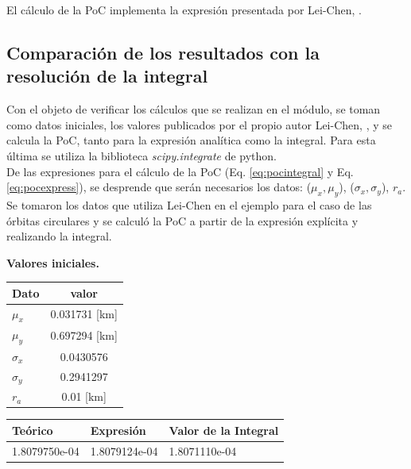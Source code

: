 El c\'alculo de la PoC implementa la expresi\'on presentada por Lei-Chen, \citep{leichen}.


\subsection*{Comparaci\'on de los resultados con la resoluci\'on de la integral}
Con el objeto de verificar los c\'alculos que se realizan en el m\'odulo, se toman como datos iniciales, los valores publicados por el propio autor Lei-Chen, \citep{leichen}, y se calcula la PoC, tanto para la expresi\'on anal\'itica como la integral. Para esta \'ultima se utiliza la biblioteca {\it{scipy.integrate}}  de python.\\

De las expresiones para el c\'alculo de la PoC (Eq. \ref{eq:pocintegral} y Eq. \ref{eq:pocexpress}), se desprende que ser\'an necesarios los datos: ($\mu_{x}, \mu_{y}$), ($\sigma_{x}, \sigma_{y}$), $r_{a}$.\\

Se tomaron los datos que utiliza Lei-Chen en el ejemplo para el caso de las \'orbitas circulares y se calcul\'o la PoC a partir de la expresi\'on expl\'icita y realizando la integral.\\

\begin{minipage}[t]{0.28\textwidth}
{\bf{Valores iniciales.}}\\

\begin{tabular}{|lc|}
\hline
 Dato & valor \\
\hline
$\mu_{x}$ & 0.031731 [km]\\
$\mu_{y}$ & 0.697294 [km]\\
$\sigma_{x}$ & 0.0430576\\
$\sigma_{y}$ & 0.2941297\\
$r_{a}$ & 0.01 [km]\\
\hline
\end{tabular}
\end{minipage}
\begin{minipage}[t]{0.7\textwidth}
\begin{mdframed}[
        linecolor=red,linewidth=2pt,%
        frametitlerule=true,%
        apptotikzsetting={\tikzset{mdfframetitlebackground/.append style={%
            shade,left color=white, right color=blue!20}}}, 
        frametitlerulecolor=blue,
        frametitlerulewidth=1pt, innertopmargin=\topskip,
        frametitle={Probabilidad de Colisi\'on},
        outerlinewidth=1.25pt
    ]
\large
{}
\begin{tabular}{|l|l|l|}
  \hline
 Te\'orico & Expresi\'on & Valor de la Integral\\
 \hline
 1.8079750e-04 & 1.8079124e-04 & 1.8071110e-04\\
 \hline
\end{tabular}
\label{tab:poccomp}
\end{mdframed}
\end{minipage}


